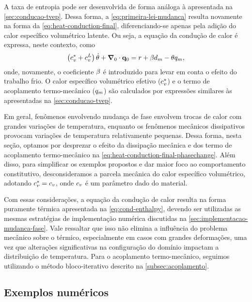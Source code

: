 \documentclass[Tese.tex]{subfiles}
\begin{document}
A taxa de entropia pode ser desenvolvida de forma análoga à apresentada na \cref{sec:conducao-tvep}. Dessa forma, a \cref{eq:primeira-lei-mudanca} resulta novamente na forma da \cref{eq:heat-conduction-final}, diferenciando-se apenas pela adição do calor específico volumétrico latente. Ou seja, a equação da condução de calor é expressa, neste contexto, como
\begin{equation}\label{eq:heat-conduction-final-phasechange}
\left(c_v^{*} + c_v^L\right)\dot{\theta} + \boldsymbol{\nabla}_0\cdot\mathbf{q}_0 = r + \beta d_{m} - \theta q_m,
\end{equation}
onde, novamente, o coeficiente $\beta$ é introduzido para levar em conta o efeito do trabalho frio. O calor específico volumétrico efetivo ($c_v^{*}$) e o termo de acoplamento termo-mecânico ($q_m$) são calculados por expressões similares às apresentadas na \cref{sec:conducao-tvep}.

Em geral, fenômenos envolvendo mudança de fase envolvem trocas de calor com grandes variações de temperatura, enquanto os fenômenos mecânicos dissipativos provocam variações de temperatura relativamente pequenas. Dessa forma, nesta seção, optamos por desprezar o efeito da dissipação mecânica e dos termo de acoplamento termo-mecânico na \cref{eq:heat-conduction-final-phasechange}. Além disso, para simplificar os exemplos propostos e dar maior foco ao comportamento constitutivo, desconsideramos a parcela mecânica do calor específico volumétrico, adotando $c_v^{*} = c_v$, onde $c_v$ é um parâmetro dado do material.

Com essas considerações, a equação da condução de calor resulta na forma puramente térmica apresentada na \cref{eq:cond-enthalpy}, devendo ser utilizadas as mesmas estratégias de implementação numérica discutidas na \cref{sec:implementacao-mudanca-fase}. Vale ressaltar que isso não elimina a influência do problema mecânico sobre o térmico, especialmente em casos com grandes deformações, uma vez que alterações significativas na configuração do domínio impactam a distribuição de temperatura. Para o acoplamento termo-mecânico, seguimos utilizando o método bloco-iterativo descrito na \cref{subsec:acoplamento}.


\subsection{Exemplos numéricos}
\end{document}
